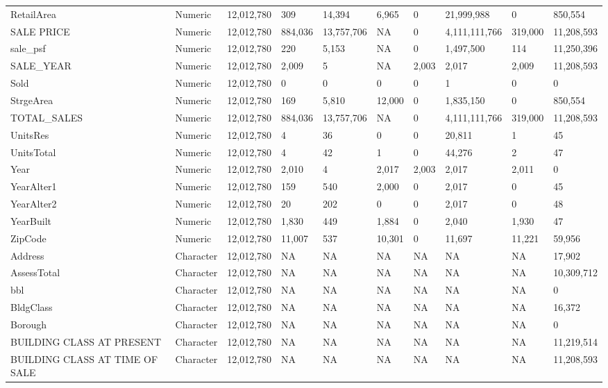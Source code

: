 \documentclass[12pt,]{article}
\begin{document}
\begin{table}
{\begin{tabular}[t]{llllllllll}
RetailArea & Numeric & 12,012,780 & 309 & 14,394 & 6,965 & 0 & 21,999,988 & 0 & 850,554\\
\addlinespace
SALE PRICE & Numeric & 12,012,780 & 884,036 & 13,757,706 & NA & 0 & 4,111,111,766 & 319,000 & 11,208,593\\
sale\_psf & Numeric & 12,012,780 & 220 & 5,153 & NA & 0 & 1,497,500 & 114 & 11,250,396\\
SALE\_YEAR & Numeric & 12,012,780 & 2,009 & 5 & NA & 2,003 & 2,017 & 2,009 & 11,208,593\\
Sold & Numeric & 12,012,780 & 0 & 0 & 0 & 0 & 1 & 0 & 0\\
StrgeArea & Numeric & 12,012,780 & 169 & 5,810 & 12,000 & 0 & 1,835,150 & 0 & 850,554\\
\addlinespace
TOTAL\_SALES & Numeric & 12,012,780 & 884,036 & 13,757,706 & NA & 0 & 4,111,111,766 & 319,000 & 11,208,593\\
UnitsRes & Numeric & 12,012,780 & 4 & 36 & 0 & 0 & 20,811 & 1 & 45\\
UnitsTotal & Numeric & 12,012,780 & 4 & 42 & 1 & 0 & 44,276 & 2 & 47\\
Year & Numeric & 12,012,780 & 2,010 & 4 & 2,017 & 2,003 & 2,017 & 2,011 & 0\\
YearAlter1 & Numeric & 12,012,780 & 159 & 540 & 2,000 & 0 & 2,017 & 0 & 45\\
\addlinespace
YearAlter2 & Numeric & 12,012,780 & 20 & 202 & 0 & 0 & 2,017 & 0 & 48\\
YearBuilt & Numeric & 12,012,780 & 1,830 & 449 & 1,884 & 0 & 2,040 & 1,930 & 47\\
ZipCode & Numeric & 12,012,780 & 11,007 & 537 & 10,301 & 0 & 11,697 & 11,221 & 59,956\\
Address & Character & 12,012,780 & NA & NA & NA & NA & NA & NA & 17,902\\
AssessTotal & Character & 12,012,780 & NA & NA & NA & NA & NA & NA & 10,309,712\\
\addlinespace
bbl & Character & 12,012,780 & NA & NA & NA & NA & NA & NA & 0\\
BldgClass & Character & 12,012,780 & NA & NA & NA & NA & NA & NA & 16,372\\
Borough & Character & 12,012,780 & NA & NA & NA & NA & NA & NA & 0\\
BUILDING CLASS AT PRESENT & Character & 12,012,780 & NA & NA & NA & NA & NA & NA & 11,219,514\\
BUILDING CLASS AT TIME OF SALE & Character & 12,012,780 & NA & NA & NA & NA & NA & NA & 11,208,593\\

\end{tabular}}
\end{table}
\end{document}

